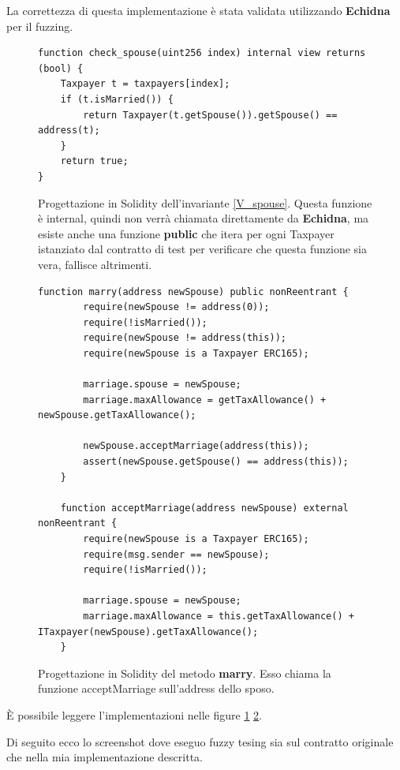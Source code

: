 \documentclass[conference]{IEEEtran}
\begin{document}
La correttezza di questa implementazione è stata validata utilizzando \textbf{Echidna} per il fuzzing.

\begin{figure}
	\centering
	\begin{lstlisting}[style=soliditystyle]
function check_spouse(uint256 index) internal view returns (bool) {
    Taxpayer t = taxpayers[index];
    if (t.isMarried()) {
        return Taxpayer(t.getSpouse()).getSpouse() == address(t);
    }
    return true;
}
\end{lstlisting}
	\caption{Progettazione in Solidity dell'invariante \ref{V_spouse}. Questa funzione è internal, quindi non verrà chiamata direttamente
		da \textbf{Echidna}, ma esiste anche una funzione \textbf{public} che itera per ogni Taxpayer
		istanziato dal contratto di test per verificare che questa funzione sia vera, fallisce altrimenti.}
	\label{code:V_spouse}
\end{figure}

\begin{figure}
	\centering
	\begin{lstlisting}[style=soliditystyle]
function marry(address newSpouse) public nonReentrant {
        require(newSpouse != address(0));
        require(!isMarried());
        require(newSpouse != address(this));
        require(newSpouse is a Taxpayer ERC165);

        marriage.spouse = newSpouse;
        marriage.maxAllowance = getTaxAllowance() + newSpouse.getTaxAllowance();

        newSpouse.acceptMarriage(address(this));
        assert(newSpouse.getSpouse() == address(this));
    }

    function acceptMarriage(address newSpouse) external nonReentrant {
        require(newSpouse is a Taxpayer ERC165);
        require(msg.sender == newSpouse);
        require(!isMarried());

        marriage.spouse = newSpouse;
        marriage.maxAllowance = this.getTaxAllowance() + ITaxpayer(newSpouse).getTaxAllowance();
    }
\end{lstlisting}
	\caption{
		Progettazione in Solidity del metodo \textbf{marry}. Esso chiama la funzione acceptMarriage sull'address dello sposo.
	}
	\label{code:marry}
\end{figure}

È possibile leggere l'implementazioni nelle figure \ref{code:V_spouse}
\ref{code:marry}.

Di seguito ecco lo screenshot dove eseguo fuzzy tesing sia sul contratto originale che nella mia implementazione descritta.
\end{document}
